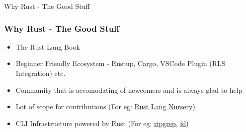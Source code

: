 \begin{section}{Why Rust - The Good Stuff}
  \begin{frame}
    \frametitle{Why Rust - The Good Stuff}
    \begin{itemize}
    \item The Rust Lang Book \cite{RustLang}
    \item Beginner Friendly Ecosystem - Rustup, Cargo, VSCode Plugin (RLS Integration) etc.
    \item Community that is accomodating of newcomers and is always glad to help
    \item Lot of scope for contributions (For eg: \href{https://github.com/rust-lang-nursery/}{Rust Lang Nursery})
    \item CLI Infrastructure powered by Rust (For eg: \href{https://github.com/BurntSushi/riggrep/}{ripgrep}, \href{https://github.com/sharkdp/fd/}{fd})
    \end{itemize}
  \end{frame}
\end{section}

